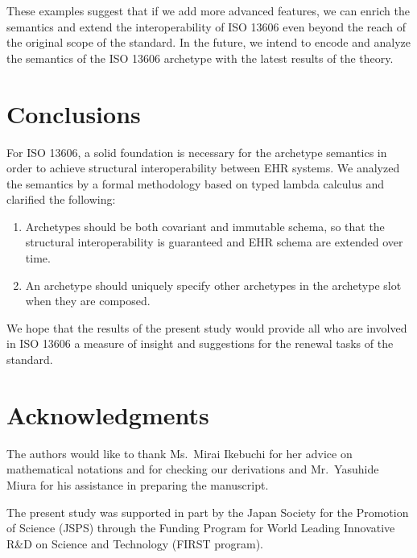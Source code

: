 \documentclass[preprint,3p,onecolumn,times,review]{elsarticle}
\begin{document}
These examples suggest that if we add more advanced features, we can enrich the semantics and extend the interoperability of ISO 13606 even beyond the reach of the original scope of the standard. In the future, we intend to encode and analyze the semantics of the ISO 13606 archetype with the latest results of the theory.


\section{Conclusions}

For ISO 13606, a solid foundation is necessary for the archetype semantics in order to achieve structural interoperability between EHR systems.
We analyzed the semantics by a formal methodology based on typed lambda calculus and clarified the following:

\begin{enumerate}
\item Archetypes should be both covariant and immutable schema, so that the structural interoperability is guaranteed and EHR schema are extended over time.
\item An archetype should uniquely specify other archetypes in the archetype slot when they are composed.
\end{enumerate}

We hope that the results of the present study would provide all who are involved in ISO 13606 a measure of insight and suggestions for the renewal tasks of the standard.

\section*{Acknowledgments}

The authors would like to thank Ms.~Mirai Ikebuchi for her advice on mathematical notations and for checking our derivations and Mr.~Yasuhide Miura for his assistance in preparing the manuscript.

The present study was supported in part by the Japan Society for the Promotion of Science (JSPS) through the Funding Program for World Leading Innovative R\&D on Science and Technology (FIRST program).


%
%
%
%
%
%
%
%
%

\end{document}
